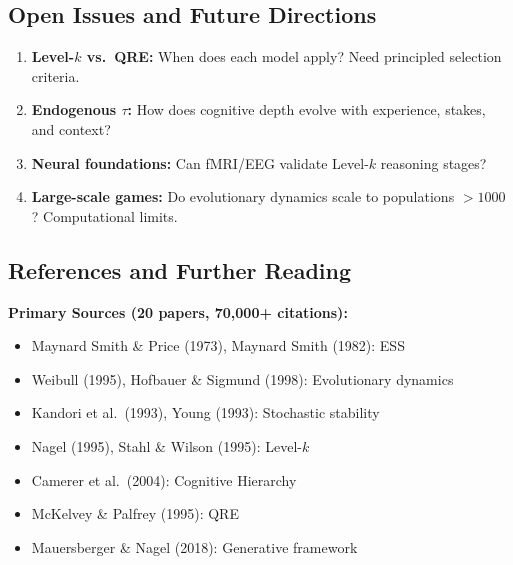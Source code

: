 \subsection{Open Issues and Future Directions}
\label{sec:ad-open-issues}


\begin{enumerate}
    \item \textbf{Level-$k$ vs.\ QRE:} When does each model apply? Need
    principled selection criteria.

    \item \textbf{Endogenous $\tau$:} How does cognitive depth evolve with
    experience, stakes, and context?

    \item \textbf{Neural foundations:} Can fMRI/EEG validate Level-$k$ reasoning
    stages?

    \item \textbf{Large-scale games:} Do evolutionary dynamics scale to
    populations $>1000$? Computational limits.
\end{enumerate}

\subsection{References and Further Reading}
\label{sec:ad-references}


\textbf{Primary Sources (20 papers, 70,000+ citations):}
\begin{itemize}[nosep]
    \item Maynard Smith \& Price (1973), Maynard Smith (1982): ESS
    \item Weibull (1995), Hofbauer \& Sigmund (1998): Evolutionary dynamics
    \item Kandori et al.\ (1993), Young (1993): Stochastic stability
    \item Nagel (1995), Stahl \& Wilson (1995): Level-$k$
    \item Camerer et al.\ (2004): Cognitive Hierarchy
    \item McKelvey \& Palfrey (1995): QRE
    \item Mauersberger \& Nagel (2018): Generative framework
\end{itemize}

